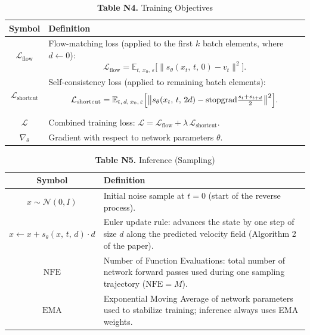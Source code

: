 \begin{table}[h]
\centering
\caption*{\textbf{Table N4.} Training Objectives}
\begin{tabular}{@{} c p{10cm} @{}}
\toprule
\textbf{Symbol} & \textbf{Definition} \\
\midrule
$\mathcal{L}_{\mathrm{flow}}$
  & Flow-matching loss (applied to the first $k$ batch elements,
    where $d \leftarrow 0$):
    \[
      \mathcal{L}_{\mathrm{flow}}
        = \mathbb{E}_{t,\,x_0,\,\varepsilon}
          \bigl[\|s_\theta(x_t,\,t,\,0) - v_t\|^2\bigr].
    \] \\
$\mathcal{L}_{\mathrm{shortcut}}$
  & Self-consistency loss (applied to remaining batch elements):
    \[
      \mathcal{L}_{\mathrm{shortcut}}
        = \mathbb{E}_{t,\,d,\,x_0,\,\varepsilon}
          \Bigl[\bigl\|s_\theta(x_t,\,t,\,2d)
            - \mathrm{stopgrad}
              \tfrac{s_t + s_{t+d}}{2}\bigr\|^2\Bigr].
    \] \\
$\mathcal{L}$
  & Combined training loss:
    $\mathcal{L} = \mathcal{L}_{\mathrm{flow}}
                 + \lambda\,\mathcal{L}_{\mathrm{shortcut}}$. \\
$\nabla_\theta$
  & Gradient with respect to network parameters $\theta$. \\
\bottomrule
\end{tabular}
\end{table}

\begin{table}[h]
\centering
\caption*{\textbf{Table N5.} Inference (Sampling)}
\begin{tabular}{@{} c p{10cm} @{}}
\toprule
\textbf{Symbol} & \textbf{Definition} \\
\midrule
$x \sim \mathcal{N}(0,I)$
  & Initial noise sample at $t=0$ (start of the reverse process). \\
$x \leftarrow x + s_\theta(x,\,t,\,d)\cdot d$
  & Euler update rule: advances the state by one step of size $d$
    along the predicted velocity field (Algorithm 2 of the paper). \\
$\mathrm{NFE}$
  & Number of Function Evaluations: total number of network forward
    passes used during one sampling trajectory
    ($\mathrm{NFE} = M$). \\
$\mathrm{EMA}$
  & Exponential Moving Average of network parameters used to
    stabilize training; inference always uses EMA weights. \\
\bottomrule
\end{tabular}
\end{table}

